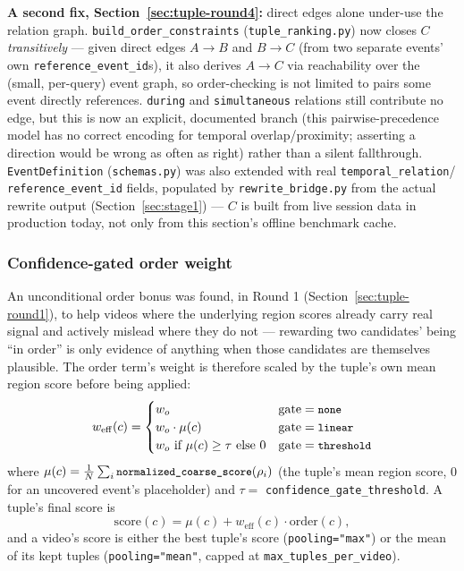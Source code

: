 \documentclass[11pt]{article}
\newcommand{\code}[1]{\texttt{\small #1}}
\newcommand{\file}[1]{\texttt{\footnotesize #1}}
\newcommand{\corr}[1]{\textbf{\textcolor{red!60!black}{#1}}}
\begin{document}
\corr{A second fix, Section~\ref{sec:tuple-round4}:} direct edges alone
under-use the relation graph. \code{build\_order\_constraints}
(\file{tuple\_ranking.py}) now closes $C$ \emph{transitively} --- given
direct edges $A\!\to\!B$ and $B\!\to\!C$ (from two separate events' own
\code{reference\_event\_id}s), it also derives $A\!\to\!C$ via reachability
over the (small, per-query) event graph, so order-checking is not limited to
pairs some event directly references. \code{during} and \code{simultaneous}
relations still contribute no edge, but this is now an explicit, documented
branch (this pairwise-precedence model has no correct encoding for
temporal overlap/proximity; asserting a direction would be wrong as often as
right) rather than a silent fallthrough. \code{EventDefinition}
(\file{schemas.py}) was also extended with real \code{temporal\_relation}/
\code{reference\_event\_id} fields, populated by \file{rewrite\_bridge.py}
from the actual rewrite output (Section~\ref{sec:stage1}) --- $C$ is built
from live session data in production today, not only from this section's
offline benchmark cache.

\subsubsection{Confidence-gated order weight}
An unconditional order bonus was found, in Round 1
(Section~\ref{sec:tuple-round1}), to help videos where the underlying
region scores already carry real signal and actively mislead where they do
not --- rewarding two candidates' being ``in order'' is only evidence of
anything when those candidates are themselves plausible. The order term's
weight is therefore scaled by the tuple's own mean region score before
being applied:
\begin{equation}
  w_{\mathrm{eff}}(c) =
  \begin{cases}
    w_o & \text{gate} = \code{none} \\
    w_o \cdot \mu(c) & \text{gate} = \code{linear} \\
    w_o \ \text{if}\ \mu(c) \ge \tau\ \text{else}\ 0 & \text{gate} = \code{threshold}
  \end{cases}
  \label{eq:gate}
\end{equation}
where $\mu(c) = \frac{1}{N}\sum_i \code{normalized\_coarse\_score}(\rho_i)$
(the tuple's mean region score, $0$ for an uncovered event's placeholder)
and $\tau=$ \code{confidence\_gate\_threshold}. A tuple's final score is
\begin{equation}
  \mathrm{score}(c) = \mu(c) + w_{\mathrm{eff}}(c) \cdot \mathrm{order}(c),
  \label{eq:tuple-score}
\end{equation}
and a video's score is either the best tuple's score
(\code{pooling=}\code{"max"}) or the mean of its kept tuples
(\code{pooling=}\code{"mean"}, capped at \code{max\_tuples\_per\_video}).
\end{document}
